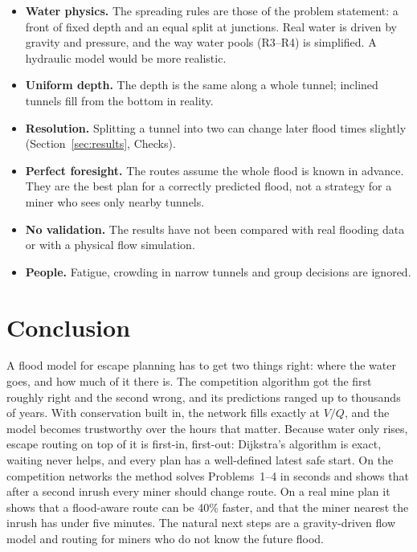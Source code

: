 \documentclass[11pt,a4paper]{article}
\theoremstyle{remark}
\begin{document}
\begin{itemize}[leftmargin=1.5em, itemsep=2pt, topsep=2pt]
  \item \textbf{Water physics.} The spreading rules are those of the problem statement: a front of fixed depth and an equal split at junctions. Real water is driven by gravity and pressure, and the way water pools (R3--R4) is simplified. A hydraulic model would be more realistic.
  \item \textbf{Uniform depth.} The depth is the same along a whole tunnel; inclined tunnels fill from the bottom in reality.
  \item \textbf{Resolution.} Splitting a tunnel into two can change later flood times slightly (Section~\ref{sec:results}, Checks).
  \item \textbf{Perfect foresight.} The routes assume the whole flood is known in advance. They are the best plan for a correctly predicted flood, not a strategy for a miner who sees only nearby tunnels.
  \item \textbf{No validation.} The results have not been compared with real flooding data or with a physical flow simulation.
  \item \textbf{People.} Fatigue, crowding in narrow tunnels and group decisions are ignored.
\end{itemize}

\section{Conclusion}

A flood model for escape planning has to get two things right: where the water goes, and how much of it there is. The competition algorithm got the first roughly right and the second wrong, and its predictions ranged up to thousands of years. With conservation built in, the network fills exactly at $V/Q$, and the model becomes trustworthy over the hours that matter. Because water only rises, escape routing on top of it is first-in, first-out: Dijkstra's algorithm is exact, waiting never helps, and every plan has a well-defined latest safe start. On the competition networks the method solves Problems~1--4 in seconds and shows that after a second inrush every miner should change route. On a real mine plan it shows that a flood-aware route can be 40\% faster, and that the miner nearest the inrush has under five minutes. The natural next steps are a gravity-driven flow model and routing for miners who do not know the future flood.
\end{document}
